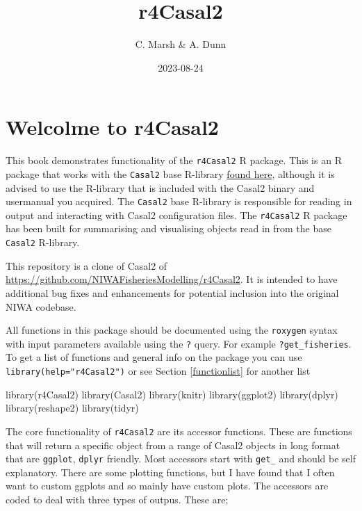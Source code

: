 \documentclass[
]{book}
\title{r4Casal2}
\author{C. Marsh \& A. Dunn}
\date{2023-08-24}
\newenvironment{Shaded}{\begin{snugshade}}{\end{snugshade}}
\newcommand{\FunctionTok}[1]{\textcolor[rgb]{0.00,0.00,0.00}{#1}}
\newcommand{\NormalTok}[1]{#1}
\begin{document}
\maketitle

{
\setcounter{tocdepth}{1}
\tableofcontents
}
\hypertarget{welcolme-to-r4casal2}{%
\chapter{\texorpdfstring{Welcolme to \textbf{r4Casal2}}{Welcolme to r4Casal2}}\label{welcolme-to-r4casal2}}

This book demonstrates functionality of the \texttt{r4Casal2} R package. This is an R package that works with the \texttt{Casal2} base R-library \href{https://github.com/alistairdunn1/CASAL2/tree/master/R-libraries}{found here}, although it is advised to use the R-library that is included with the Casal2 binary and usermanual you acquired. The \texttt{Casal2} base R-library is responsible for reading in output and interacting with Casal2 configuration files. The \texttt{r4Casal2} R package has been built for summarising and visualising objects read in from the base \texttt{Casal2} R-library.

This repository is a clone of Casal2 of \url{https://github.com/NIWAFisheriesModelling/r4Casal2}. It is intended to have additional bug fixes and enhancements for potential inclusion into the original NIWA codebase.

All functions in this package should be documented using the \texttt{roxygen} syntax with input parameters available using the \texttt{?} query. For example \texttt{?get\_fisheries}. To get a list of functions and general info on the package you can use \texttt{library(help="r4Casal2")} or see Section \ref{functionlist} for another list

\begin{Shaded}
\begin{Highlighting}[]
\FunctionTok{library}\NormalTok{(r4Casal2)}
\FunctionTok{library}\NormalTok{(Casal2)}
\FunctionTok{library}\NormalTok{(knitr)}
\FunctionTok{library}\NormalTok{(ggplot2)}
\FunctionTok{library}\NormalTok{(dplyr)}
\FunctionTok{library}\NormalTok{(reshape2)}
\FunctionTok{library}\NormalTok{(tidyr)}
\end{Highlighting}
\end{Shaded}

The core functionality of \texttt{r4Casal2} are its accessor functions. These are functions that will return a specific object from a range of Casal2 objects in long format that are \texttt{ggplot}, \texttt{dplyr} friendly. Most accessors start with \texttt{get\_} and should be self explanatory. There are some plotting functions, but I have found that I often want to custom ggplots and so mainly have custom plots. The accessors are coded to deal with three types of outpus. These are;
\end{document}
